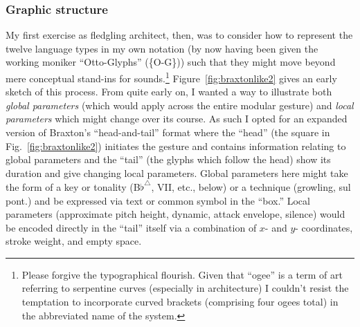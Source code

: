    \subsubsection{Graphic structure}
    My first exercise as fledgling architect, then, was to consider how to represent the twelve language types in my own notation (by now having been given the working moniker ``Otto-Glyphs'' (\{O-G\})) such that they might move beyond mere conceptual stand-ins for sounds.\footnote{Please forgive the typographical flourish. Given that ``ogee'' is a term of art referring to serpentine curves (especially in architecture) I couldn't resist the temptation to incorporate curved brackets (comprising four ogees total) in the abbreviated name of the system.} Figure~\ref{fig:braxtonlike2} gives an early sketch of this process. From quite early on, I wanted a way to illustrate both \textit{global parameters} (which would apply across the entire modular gesture) and \textit{local parameters} which might change over its course. As such I opted for an expanded version of Braxton's ``head-and-tail'' format where the ``head'' (the square in Fig.~\ref{fig:braxtonlike2}) initiates the gesture and contains information relating to global parameters and the ``tail'' (the glyphs which follow the head) show its duration and give changing local parameters. Global parameters here might take the form of a key or tonality (B$\flat^{\triangle}$, VII, etc., below) or a technique (growling, sul pont.) and be expressed via text or common symbol in the ``box.'' Local parameters (approximate pitch height, dynamic, attack envelope, silence) would be encoded directly in the ``tail'' itself via a combination of $x$- and $y$- coordinates, stroke weight, and empty space.

